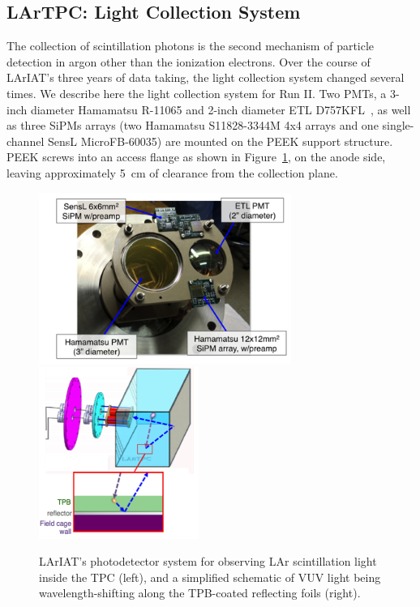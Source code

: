 \subsection{LArTPC: Light Collection System}\label{sec:TPCLight}
The collection of scintillation photons is the second mechanism of particle detection in argon other than the ionization electrons. Over the course of LArIAT's three years of data taking, the light collection system changed several times. We describe here the light collection system for Run II. Two PMTs, a 3-inch diameter Hamamatsu R-11065 and 2-inch diameter ETL D757KFL~\cite{lightsys-pmttests}, as well as three SiPMs arrays (two Hamamatsu S11828-3344M 4x4 arrays and one single-channel SensL MicroFB-60035) are mounted on the PEEK support structure. PEEK screws into an access flange as shown in Figure~\ref{lightsys_pmts}, on the anode side, leaving  approximately 5~cm of clearance from the collection plane.  

\begin{figure}
\centering
\includegraphics[height=2.2in]{Chapter-3/Images/lightsys_pmts.png}
\hspace{1cm}
\includegraphics[height=2.2in]{Chapter-3/Images/lightsys_wls.png}
\caption{LArIAT's photodetector system for observing LAr scintillation light inside the TPC (left), and a simplified schematic of VUV light being wavelength-shifting along the TPB-coated reflecting foils (right).}
\label{lightsys_pmts}
\end{figure}

